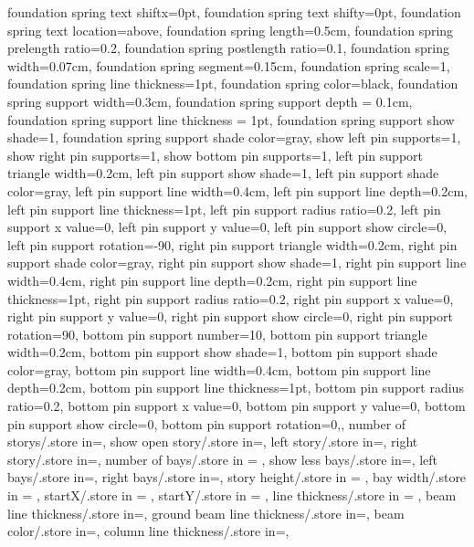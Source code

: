 {{  foundation spring text shiftx=0pt,
  foundation spring text shifty=0pt,
  foundation spring text location=above,
  foundation spring length=0.5cm,
  foundation spring prelength ratio=0.2,
  foundation spring postlength ratio=0.1,
  foundation spring width=0.07cm,
  foundation spring segment=0.15cm,
  foundation spring scale=1,
  foundation spring line thickness=1pt,
  foundation spring color=black,
  foundation spring support width=0.3cm,
  foundation spring support depth = 0.1cm,
  foundation spring support line thickness = 1pt,
  foundation spring support show shade=1,
  foundation spring support shade color=gray,
  show left pin supports=1,
  show right pin supports=1,
  show bottom pin supports=1,
  left pin support triangle width=0.2cm,
  left pin support show shade=1,
  left pin support shade color=gray,
  left pin support line width=0.4cm,
  left pin support line depth=0.2cm,
  left pin support line thickness=1pt,
  left pin support radius ratio=0.2,
  left pin support x value=0,
  left pin support y value=0,
  left pin support show circle=0,
  left pin support rotation=-90,
  right pin support triangle width=0.2cm,
  right pin support shade color=gray,
  right pin support show shade=1,
  right pin support line width=0.4cm,
  right pin support line depth=0.2cm,
  right pin support line thickness=1pt,
  right pin support radius ratio=0.2,
  right pin support x value=0,
  right pin support y value=0,
  right pin support show circle=0,
  right pin support rotation=90,
  bottom pin support number=10,
  bottom pin support triangle width=0.2cm,
  bottom pin support show shade=1,
  bottom pin support shade color=gray,
  bottom pin support line width=0.4cm,
  bottom pin support line depth=0.2cm,
  bottom pin support line thickness=1pt,
  bottom pin support radius ratio=0.2,
  bottom pin support x value=0,
  bottom pin support y value=0,
  bottom pin support show circle=0,
  bottom pin support rotation=0,},
  number of storys/.store in=\storynumber,
  show open story/.store in=\showopenstory,
  left story/.store in=\leftstory,
  right story/.store in=\rightstory,
  number of bays/.store in = \baynumber,
  show less bays/.store in=\showlessbays,
  left bays/.store in=\leftbays,
  right bays/.store in=\rightbays,
  story height/.store in = \storyheight,
  bay width/.store in = \baywidth,
  startX/.store in = \startx,
  startY/.store in = \starty,
  line thickness/.store in = \linet,
  beam line thickness/.store in=\beamlinet,
  ground beam line thickness/.store in=\groundbeamlinet,
  beam color/.store in=\beamcolor,
  column line thickness/.store in=\collinet,
}
